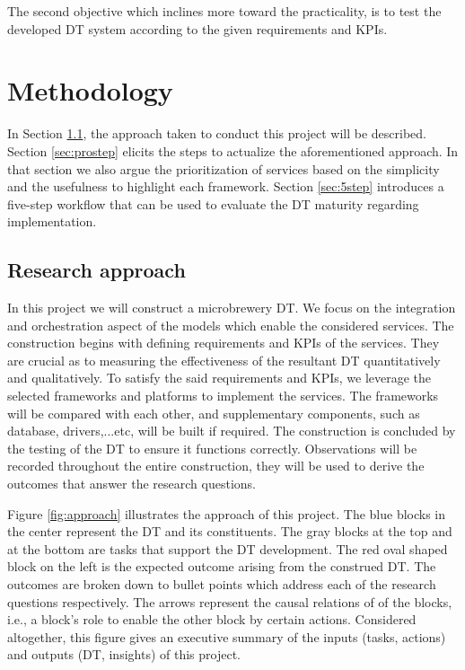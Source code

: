 \documentclass[journal,onecolumn]{IEEEtran} %
\begin{document}
The second objective which inclines more toward the practicality, is to test the developed DT system according to the given requirements and KPIs. 

\pagebreak
\section{Methodology}
In Section \ref{sec:approach}, the approach taken to conduct this project will be described. Section \ref{sec:prostep} elicits the steps to actualize the aforementioned approach. In that section we also argue the prioritization of services based on the simplicity and the usefulness to highlight each framework. Section \ref{sec:5step} introduces a five-step workflow that can be used to evaluate the DT maturity regarding implementation.

\subsection{Research approach}\label{sec:approach}
In this project we will construct a microbrewery DT. We focus on the integration and orchestration aspect of the models which enable the considered services. The construction begins with defining requirements and KPIs of the services. They are crucial as to measuring the effectiveness of the resultant DT quantitatively and qualitatively. To satisfy the said requirements and KPIs, we leverage the selected frameworks and platforms to implement the services. The frameworks will be compared with each other, and supplementary components, such as database, drivers,...etc, will be built if required. The construction is concluded by the testing of the DT to ensure it functions correctly. Observations will be recorded throughout the entire construction, they will be used to derive the outcomes that answer the research questions.

Figure \ref{fig:approach} illustrates the approach of this project. The blue blocks in the center represent the DT and its constituents. The gray blocks at the top and at the bottom are tasks that support the DT development. The red oval shaped block on the left is the expected outcome arising from the construed DT. The outcomes are broken down to bullet points which address each of the research questions respectively. The arrows represent the causal relations of of the blocks, i.e., a block's role to enable the other block by certain actions. Considered altogether, this figure gives an executive summary of the inputs (tasks, actions) and outputs (DT, insights) of this project.
\end{document}
